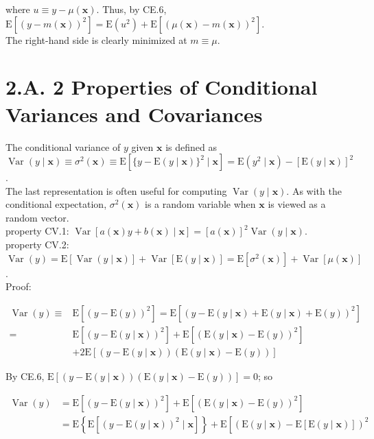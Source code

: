 \documentclass[10pt]{article}
\begin{document}
where $u \equiv y-\mu(\mathbf{x})$. Thus, by CE.6,\\
$\mathrm{E}\left[(y-m(\mathbf{x}))^{2}\right]=\mathrm{E}\left(u^{2}\right)+\mathrm{E}\left[(\mu(\mathbf{x})-m(\mathbf{x}))^{2}\right]$.\\
The right-hand side is clearly minimized at $m \equiv \mu$.

\section*{2.A. 2 Properties of Conditional Variances and Covariances}
The conditional variance of $y$ given $\mathbf{x}$ is defined as\\
$\operatorname{Var}(y \mid \mathbf{x}) \equiv \sigma^{2}(\mathbf{x}) \equiv \mathrm{E}\left[\{y-\mathrm{E}(y \mid \mathbf{x})\}^{2} \mid \mathbf{x}\right]=\mathrm{E}\left(y^{2} \mid \mathbf{x}\right)-[\mathrm{E}(y \mid \mathbf{x})]^{2}$.\\
The last representation is often useful for computing $\operatorname{Var}(y \mid \mathbf{x})$. As with the conditional expectation, $\sigma^{2}(\mathbf{x})$ is a random variable when $\mathbf{x}$ is viewed as a random vector.\\
property CV.1: $\operatorname{Var}[a(\mathbf{x}) y+b(\mathbf{x}) \mid \mathbf{x}]=[a(\mathbf{x})]^{2} \operatorname{Var}(y \mid \mathbf{x})$.\\
property CV.2: $\operatorname{Var}(y)=\mathrm{E}[\operatorname{Var}(y \mid \mathbf{x})]+\operatorname{Var}[\mathrm{E}(y \mid \mathbf{x})]=\mathrm{E}\left[\sigma^{2}(\mathbf{x})\right]+\operatorname{Var}[\mu(\mathbf{x})]$.\\
Proof:

$$
\begin{aligned}
\operatorname{Var}(y) \equiv & \mathrm{E}\left[(y-\mathrm{E}(y))^{2}\right]=\mathrm{E}\left[(y-\mathrm{E}(y \mid \mathbf{x})+\mathrm{E}(y \mid \mathbf{x})+\mathrm{E}(y))^{2}\right] \\
= & \mathrm{E}\left[(y-\mathrm{E}(y \mid \mathbf{x}))^{2}\right]+\mathrm{E}\left[(\mathrm{E}(y \mid \mathbf{x})-\mathrm{E}(y))^{2}\right] \\
& +2 \mathrm{E}[(y-\mathrm{E}(y \mid \mathbf{x}))(\mathrm{E}(y \mid \mathbf{x})-\mathrm{E}(y))]
\end{aligned}
$$

By CE.6, $\mathrm{E}[(y-\mathrm{E}(y \mid \mathbf{x}))(\mathrm{E}(y \mid \mathbf{x})-\mathrm{E}(y))]=0$; so

$$
\begin{aligned}
\operatorname{Var}(y) & =\mathrm{E}\left[(y-\mathrm{E}(y \mid \mathbf{x}))^{2}\right]+\mathrm{E}\left[(\mathrm{E}(y \mid \mathbf{x})-\mathrm{E}(y))^{2}\right] \\
& =\mathrm{E}\left\{\mathrm{E}\left[(y-\mathrm{E}(y \mid \mathbf{x}))^{2} \mid \mathbf{x}\right]\right\}+\mathrm{E}\left[(\mathrm{E}(y \mid \mathbf{x})-\mathrm{E}[\mathrm{E}(y \mid \mathbf{x})])^{2}\right.
\end{aligned}
$$
\end{document}

